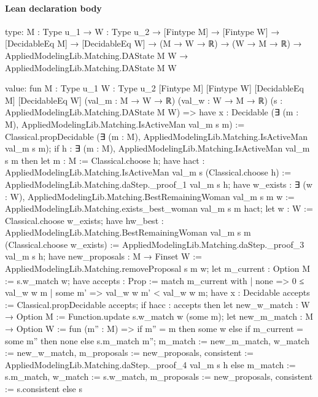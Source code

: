 \documentclass[10pt]{article}
\begin{document}
\paragraph{Lean declaration body}
\begin{ReviewVerbatim}
type:
{M : Type u_1} →
  {W : Type u_2} →
    [Fintype M] →
      [Fintype W] →
        [DecidableEq M] →
          [DecidableEq W] →
            (M → W → ℝ) →
              (W → M → ℝ) → AppliedModelingLib.Matching.DAState M W → AppliedModelingLib.Matching.DAState M W

value:
fun {M : Type u_1} {W : Type u_2} [Fintype M] [Fintype W] [DecidableEq M] [DecidableEq W] (val_m : M → W → ℝ)
    (val_w : W → M → ℝ) (s : AppliedModelingLib.Matching.DAState M W) =>
  have x : Decidable (∃ (m : M), AppliedModelingLib.Matching.IsActiveMan val_m s m) :=
    Classical.propDecidable (∃ (m : M), AppliedModelingLib.Matching.IsActiveMan val_m s m);
  if h : ∃ (m : M), AppliedModelingLib.Matching.IsActiveMan val_m s m then
    let m : M := Classical.choose h;
    have hact : AppliedModelingLib.Matching.IsActiveMan val_m s (Classical.choose h) :=
      AppliedModelingLib.Matching.daStep._proof_1 val_m s h;
    have w_exists : ∃ (w : W), AppliedModelingLib.Matching.BestRemainingWoman val_m s m w :=
      AppliedModelingLib.Matching.exists_best_woman val_m s m hact;
    let w : W := Classical.choose w_exists;
    have hw_best : AppliedModelingLib.Matching.BestRemainingWoman val_m s m (Classical.choose w_exists) :=
      AppliedModelingLib.Matching.daStep._proof_3 val_m s h;
    have new_proposals : M → Finset W := AppliedModelingLib.Matching.removeProposal s m w;
    let m_current : Option M := s.w_match w;
    have accepts : Prop :=
      match m_current with
      | none => 0 ≤ val_w w m
      | some m' => val_w w m' < val_w w m;
    have x : Decidable accepts := Classical.propDecidable accepts;
    if hacc : accepts then
      let new_w_match : W → Option M := Function.update s.w_match w (some m);
      let new_m_match : M → Option W := fun (m'' : M) =>
        if m'' = m then some w else if m_current = some m'' then none else s.m_match m'';
      { m_match := new_m_match, w_match := new_w_match, m_proposals := new_proposals,
        consistent := AppliedModelingLib.Matching.daStep._proof_4 val_m s h }
    else { m_match := s.m_match, w_match := s.w_match, m_proposals := new_proposals, consistent := s.consistent }
  else s
\end{ReviewVerbatim}
\end{document}
